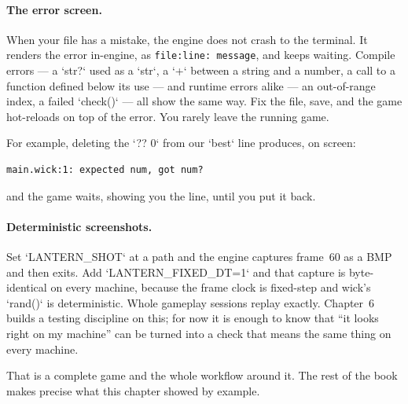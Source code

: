\paragraph{The error screen.} When your file has a mistake, the engine does
not crash to the terminal. It renders the error in-engine, as
\texttt{file:line: message}, and keeps waiting. Compile errors --- a `str?`
used as a `str`, a `+` between a string and a number, a call to a function
defined below its use --- and runtime errors alike --- an out-of-range index,
a failed `check()` --- all show the same way. Fix the file, save, and the game
hot-reloads on top of the error. You rarely leave the running game.

For example, deleting the `?? 0` from our `best` line produces, on screen:

\begin{lstlisting}[basicstyle=\ttfamily\small,keywordstyle={}]
main.wick:1: expected num, got num?
\end{lstlisting}

\noindent
and the game waits, showing you the line, until you put it back.

\paragraph{Deterministic screenshots.} Set
`LANTERN_SHOT` at a path and the engine captures frame~60 as a BMP and then
exits. Add `LANTERN_FIXED_DT=1` and that capture is byte-identical on every machine,
because the frame clock is fixed-step and wick's `rand()` is deterministic.
Whole gameplay sessions replay exactly. Chapter~6 builds a testing discipline
on this; for now it is enough to know that ``it looks right on my machine''
can be turned into a check that means the same thing on every machine.

That is a complete game and the whole workflow around it. The rest of the
book makes precise what this chapter showed by example.
